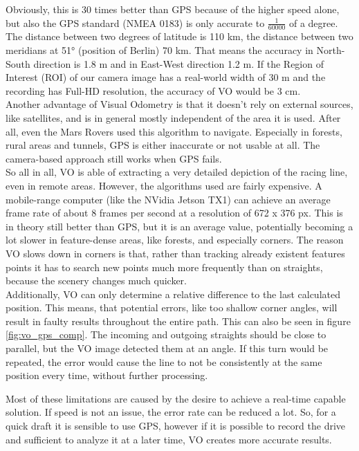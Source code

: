 Obviously, this is 30 times better than GPS because of the higher speed alone, but also the GPS standard (NMEA 0183) is only accurate to $\frac{1}{60 000}$ of a degree. The distance between two degrees of latitude is 110 km, the distance between two meridians at 51° (position of Berlin) 70 km. That means the accuracy in North-South direction is 1.8 m and in East-West direction 1.2 m. If the Region of Interest (ROI) of our camera image has a real-world width of 30 m and the recording has Full-HD resolution, the accuracy of VO would be 3 cm.\\
Another advantage of Visual Odometry is that it doesn't rely on external sources, like satellites, and is in general mostly independent of the area it is used. After all, even the Mars Rovers \cite{maimone07} used this algorithm to navigate. Especially in forests, rural areas and tunnels, GPS is either inaccurate or not usable at all. The camera-based approach still works when GPS fails.\\
So all in all, VO is able of extracting a very detailed depiction of the racing line, even in remote areas. However, the algorithms used are fairly expensive.
A mobile-range computer (like the NVidia Jetson TX1) can achieve an average frame rate of about 8 frames per second at a resolution of 672 x 376 px. This is in theory still better than GPS, but it is an average value, potentially becoming a lot slower in feature-dense areas, like forests, and especially corners. The reason VO slows down in corners is that, rather than tracking already existent features points it has to search new points much more frequently than on straights, because the scenery changes much quicker.\\
Additionally, VO can only determine a relative difference to the last calculated position. This means, that potential errors, like too shallow corner angles, will result in faulty results throughout the entire path. This can also be seen in figure \ref{fig:vo_gps_comp}. The incoming and outgoing straights should be close to parallel, but the VO image detected them at an angle. If this turn would be repeated, the error would cause the line to not be consistently at the same position every time, without further processing.

Most of these limitations are caused by the desire to achieve a real-time capable solution. If speed is not an issue, the error rate can be reduced a lot. So, for a quick draft it is sensible to use GPS, however if it is possible to record the drive and sufficient to analyze it at a later time, VO creates more accurate results. 


